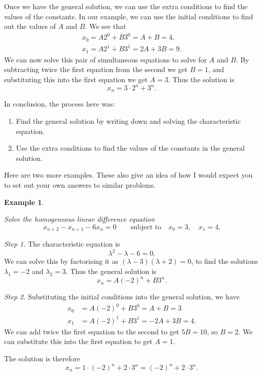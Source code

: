 \documentclass[
  a4paper,
]{article}
\providecommand{\tightlist}{%
  \setlength{\itemsep}{0pt}\setlength{\parskip}{0pt}}
\theoremstyle{definition}
\theoremstyle{definition}
\newtheorem{example}{Example}[section]
\theoremstyle{definition}
\theoremstyle{remark}
\begin{document}
Once we have the general solution, we can use the extra conditions to find the values of the constants. In our example, we can use the initial conditions to find out the values of \(A\) and \(B\). We see that
\begin{gather*}
x_0 = A2^0 + B3^0 = A + B = 4 , \\
x_1 = A2^1 + B3^1 = 2A + 3B = 9 .
\end{gather*}
We can now solve this pair of simultaneous equations to solve for \(A\) and \(B\). By subtracting twice the first equation from the second we get \(B = 1\), and substituting this into the first equation we get \(A = 3\). Thus the solution is
\[ x_n = 3\cdot 2^n + 3^n . \]

In conclusion, the process here was:

\begin{enumerate}
\def\labelenumi{\arabic{enumi}.}
\tightlist
\item
  Find the general solution by writing down and solving the characteristic equation.
\item
  Use the extra conditions to find the values of the constants in the general solution.
\end{enumerate}

Here are two more examples. These also give an idea of how I would expect you to set out your own answers to similar problems.

\begin{example}
\protect\hypertarget{exm:lde1}{}\label{exm:lde1}

\emph{Solve the homogeneous linear difference equation}
\[ x_{n+2} - x_{n+1} - 6x_n = 0 \qquad \text{subject to} \quad x_0 = 3,\quad x_1 = 4 . \]

\emph{Step 1.} The characteristic equation is
\[ \lambda^2 - \lambda - 6 = 0 . \]
We can solve this by factorising it as \((\lambda - 3) (\lambda + 2) = 0\),
to find the solutions \(\lambda_1 = -2\) and \(\lambda_2 = 3\). Thus the general solution is
\[ x_n = A(-2)^n + B3^n . \]

\emph{Step 2.} Substituting the initial conditions into the general solution, we have
\begin{align*}
x_0 &= A(-2)^0 + B3^0 = A + B = 3 \\
x_1 &= A(-2)^1 + B3^1 = -2A + 3B = 4 .
\end{align*}
We can add twice the first equation to the second to get \(5B = 10\), so \(B=2\). We can substitute this into the first equation to get \(A = 1\).

The solution is therefore
\[ x_n = 1\cdot(-2)^n + 2 \cdot 3^n = (-2)^n + 2 \cdot 3^n . \]

\end{example}
\end{document}
